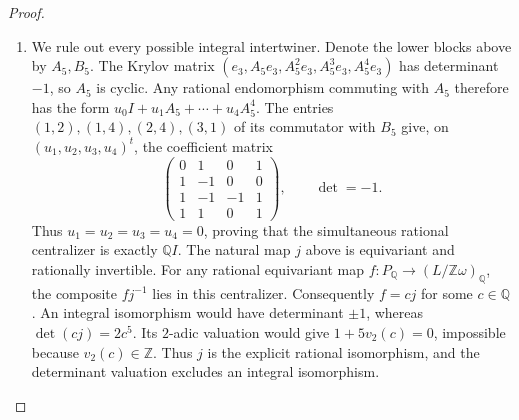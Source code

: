 \begin{proof}
\begin{enumerate}[label={$\langle1\rangle$\arabic*.}]
\item We rule out every possible integral intertwiner.  Denote the lower blocks above by $A_5,B_5$.
The Krylov matrix $(e_3,A_5e_3,A_5^2e_3,A_5^3e_3,A_5^4e_3)$
has determinant $-1$, so $A_5$ is cyclic.  Any rational endomorphism
commuting with $A_5$ therefore has the form
$u_0I+u_1A_5+\cdots+u_4A_5^4$.
The entries $(1,2),(1,4),(2,4),(3,1)$ of its commutator with $B_5$
give, on $(u_1,u_2,u_3,u_4)^t$, the coefficient matrix
\[
\begin{pmatrix}
0&1&0&1\\1&-1&0&0\\1&-1&-1&1\\1&1&0&1
\end{pmatrix},\qquad \det=-1.
\]
Thus $u_1=u_2=u_3=u_4=0$, proving that the simultaneous rational
centralizer is exactly $\mathbb QI$.
The natural map $j$ above is equivariant and rationally invertible.
For any rational equivariant map $f:P_{\mathbb Q}\to
(L/\mathbb Z\omega)_{\mathbb Q}$, the composite $fj^{-1}$ lies
in this centralizer.  Consequently $f=cj$ for some $c\in\mathbb Q$.
An integral isomorphism would have determinant $\pm1$, whereas
$\det(cj)=2c^5$.  Its $2$-adic valuation would give
$1+5v_2(c)=0$, impossible because $v_2(c)\in\mathbb Z$.
Thus $j$ is the explicit rational isomorphism, and the determinant
valuation excludes an integral isomorphism.

\end{enumerate}
\end{proof}




